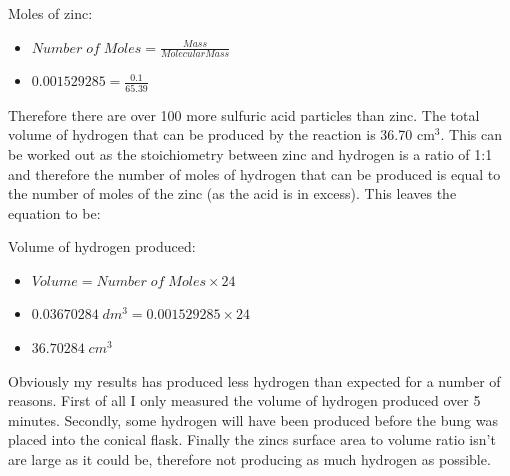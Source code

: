Moles of zinc:
\begin{itemize}
\item $Number \; of \; Moles = \frac{Mass}{Molecular Mass}$
\item $0.001529285 = \frac{0.1}{65.39}$
\end{itemize}

Therefore there are over 100 more sulfuric acid particles than zinc. The total volume of hydrogen that can be produced by the reaction is 36.70 cm$^3$. This can be worked out as the stoichiometry between zinc and hydrogen is a ratio of 1:1 and therefore the number of moles of hydrogen that can be produced is equal to the number of moles of the zinc (as the acid is in excess). This leaves the equation to be:

Volume of hydrogen produced:
\begin{itemize}
\item $Volume = Number \; of \;  Moles \times 24$
\item $0.03670284 \; dm^3 = 0.001529285 \times 24$
\item $36.70284 \; cm^3$
\end{itemize}

Obviously my results has produced less hydrogen than expected for a number of reasons. First of all I only measured the volume of hydrogen produced over 5 minutes. Secondly, some hydrogen will have been produced before the bung was placed into the conical flask. Finally the zincs surface area to volume ratio isn't are large as it could be, therefore not producing as much hydrogen as possible.

